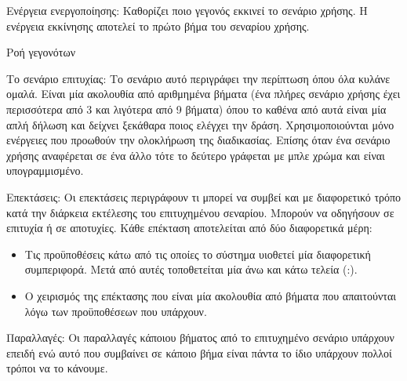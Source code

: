  Ενέργεια ενεργοποίησης: Καθορίζει ποιο γεγονός εκκινεί το σενάριο χρήσης. Η ενέργεια εκκίνησης αποτελεί το πρώτο βήμα του σεναρίου χρήσης. 
 
 Ροή γεγονότων
 
 Το σενάριο επιτυχίας: Το σενάριο αυτό περιγράφει την περίπτωση όπου όλα κυλάνε ομαλά. Είναι μία ακολουθία από αριθμημένα βήματα (ένα πλήρες σενάριο χρήσης έχει περισσότερα από 3 και λιγότερα από 9 βήματα) όπου το καθένα από αυτά είναι μία απλή δήλωση και δείχνει ξεκάθαρα ποιος ελέγχει την δράση.  Χρησιμοποιούνται μόνο ενέργειες που προωθούν την ολοκλήρωση της διαδικασίας. Επίσης όταν ένα σενάριο χρήσης αναφέρεται σε ένα άλλο τότε το δεύτερο γράφεται με μπλε χρώμα και είναι υπογραμμισμένο.
 
 Επεκτάσεις: Οι επεκτάσεις περιγράφουν τι μπορεί να συμβεί και με διαφορετικό τρόπο κατά την διάρκεια εκτέλεσης του επιτυχημένου σεναρίου. Μπορούν να οδηγήσουν σε επιτυχία ή σε αποτυχίες. Κάθε επέκταση αποτελείται από δύο διαφορετικά μέρη:
 \begin{itemize}
 \item Τις προϋποθέσεις κάτω από τις οποίες το σύστημα υιοθετεί μία διαφορετική συμπεριφορά. Μετά από αυτές τοποθετείται μία άνω και κάτω τελεία (:).
 \item Ο χειρισμός της επέκτασης που είναι μία ακολουθία από βήματα που απαιτούνται λόγω των προϋποθέσεων που υπάρχουν.
 \end{itemize}
 
 Παραλλαγές: Οι παραλλαγές κάποιου βήματος από το επιτυχημένο σενάριο υπάρχουν επειδή ενώ αυτό που συμβαίνει σε κάποιο βήμα είναι πάντα το ίδιο υπάρχουν πολλοί τρόποι να το κάνουμε.
 
